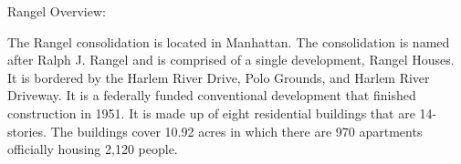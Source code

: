 Rangel Overview: 

The Rangel consolidation is located in Manhattan. The consolidation is named after Ralph J. Rangel and is comprised of a single development, Rangel Houses. It is bordered by the Harlem River Drive, Polo Grounds, and Harlem River Driveway. It is a federally funded conventional development that finished construction in 1951. It is made up of eight residential buildings that are 14-stories. The buildings cover 10.92 acres in which there are 970 apartments officially housing 2,120 people. 